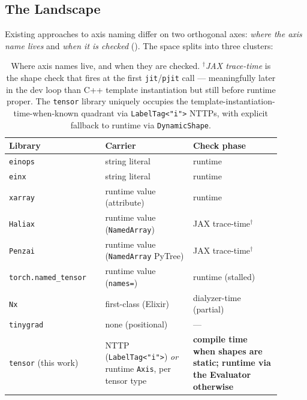 \documentclass[10pt,twocolumn]{article}
\newcommand{\code}[1]{\texttt{#1}}
\begin{document}
\subsection{The Landscape}
\label{sec:bg-landscape}

Existing approaches to axis naming differ on two orthogonal axes:
\emph{where the axis name lives} and \emph{when it is checked}
(). The space splits into three clusters:

\begin{table}[t]
\centering\small
\begin{tabular}{@{}p{0.30\linewidth} p{0.30\linewidth} p{0.30\linewidth}@{}}
\toprule
\textbf{Library} & \textbf{Carrier} & \textbf{Check phase} \\
\midrule
\code{einops}~\cite{rogozhnikov2022einops}     & string literal              & runtime \\
\code{einx}~\cite{flick2026einx}         & string literal              & runtime \\
\code{xarray}~\cite{xarray}     & runtime value (attribute)   & runtime \\
\code{Haliax}~\cite{haliax}     & runtime value (\code{NamedArray}) & JAX trace-time$^\dagger$ \\
\code{Penzai}~\cite{penzai}     & runtime value (\code{NamedArray} PyTree) & JAX trace-time$^\dagger$ \\
\code{torch.named\_tensor}~\cite{pytorch-named-tensors}
                                & runtime value (\code{names=})
                                                              & runtime (stalled) \\
\code{Nx}~\cite{nx-elixir}      & first-class (Elixir)        & dialyzer-time (partial) \\
\code{tinygrad}~\cite{tinygrad} & none (positional)           & --- \\
\midrule
\code{tensor} (this work)       & NTTP (\code{LabelTag<"i">}) \emph{or}
                                  runtime \code{Axis}, per tensor type
                                & \textbf{compile time when shapes are
                                  static; runtime via the Evaluator
                                  otherwise} \\
\bottomrule
\end{tabular}
\caption{Where axis names live, and when they are checked.
$^\dagger$\emph{JAX trace-time} is the shape check that fires at the
first \code{jit}/\code{pjit} call --- meaningfully later in the dev
loop than C++ template instantiation but still before runtime
proper. The \code{tensor} library uniquely occupies the
template-instantiation-time-when-known quadrant via
\code{LabelTag<"i">} NTTPs, with explicit fallback to runtime via
\code{DynamicShape}.}
\label{tab:landscape}
\end{table}
\end{document}
